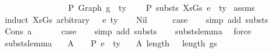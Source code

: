 \begin{isabellebody}
\ \ \ \ \ \ \ \ \ \ \ \ \ \ \ {\isacharbrackleft}{\kern0pt}{\isacharbrackright}{\kern0pt}\ {\isasymturnstile}{\isacharbraceleft}{\kern0pt}P{\isacharbraceright}{\kern0pt}\ {\isacharparenleft}{\kern0pt}Graph\ g{\isacharparenright}{\kern0pt}\ {\isacharcolon}{\kern0pt}\ ty{\isacharparenright}{\kern0pt}{\isachardoublequoteclose}\isanewline
\ \ \ {\isachardoublequoteopen}{\isasymGamma}{}\ {\isasymturnstile}{\isacharbraceleft}{\kern0pt}P{\isacharbraceright}{\kern0pt}\ substs\ XsGs\ e{}\ {\isacharcolon}{\kern0pt}\ ty{}{\isachardoublequoteclose}\isanewline
%
\isadelimproof
%
\endisadelimproof
%
\isatagproof
{}\isamarkupfalse%
\ assms\isanewline
{}\isamarkupfalse%
\ {\isacharparenleft}{\kern0pt}induct\ XsGs\ arbitrary{\isacharcolon}{\kern0pt}\ {\isasymGamma}\ {\isasymGamma}{}\ e{}\ ty{}{\isacharparenright}{\kern0pt}\isanewline
\ \ \isamarkupfalse%
\ Nil\isanewline
\ \ \isamarkupfalse%
\ \isamarkupfalse%
\ {\isacharquery}{\kern0pt}case\isanewline
\ \ \isamarkupfalse%
\ {\isacharparenleft}{\kern0pt}simp\ add{\isacharcolon}{\kern0pt}\ substs{\isacharparenright}{\kern0pt}\isanewline
{}\isamarkupfalse%
\isanewline
\ \ \isamarkupfalse%
\ {\isacharparenleft}{\kern0pt}Cons\ a\ {\isasymGamma}{\isacharparenright}{\kern0pt}\isanewline
\ \ \isamarkupfalse%
\ \isamarkupfalse%
\ {\isacharquery}{\kern0pt}case\isanewline
\ \ \isamarkupfalse%
\ {\isacharparenleft}{\kern0pt}simp\ add{\isacharcolon}{\kern0pt}\ substs{\isacharparenright}{\kern0pt}\isanewline
\ \ \isamarkupfalse%
\ substs{\isacharunderscore}{\kern0pt}lemma{}\ \isamarkupfalse%
\ force\isanewline
{}\isamarkupfalse%
%
\endisatagproof
{\isafoldproof}%
%
\isadelimproof
\isanewline
%
\endisadelimproof
\isanewline
\isanewline
{}\isamarkupfalse%
\ substs{\isacharunderscore}{\kern0pt}lemma{\isacharcolon}{\kern0pt}\isanewline
\ \ \ A{}{\isacharcolon}{\kern0pt}\ {\isachardoublequoteopen}{\isasymGamma}\ {\isacharat}{\kern0pt}\ {\isasymGamma}{}\ {\isasymturnstile}{\isacharbraceleft}{\kern0pt}P{\isacharbraceright}{\kern0pt}\ e{}\ {\isacharcolon}{\kern0pt}\ ty{}{\isachardoublequoteclose}\isanewline
\ \ \ A{}{\isacharcolon}{\kern0pt}\ {\isachardoublequoteopen}length\ {\isasymGamma}\ {\isacharequal}{\kern0pt}\ length\ gs{\isachardoublequoteclose}\isanewline

\end{isabellebody}
